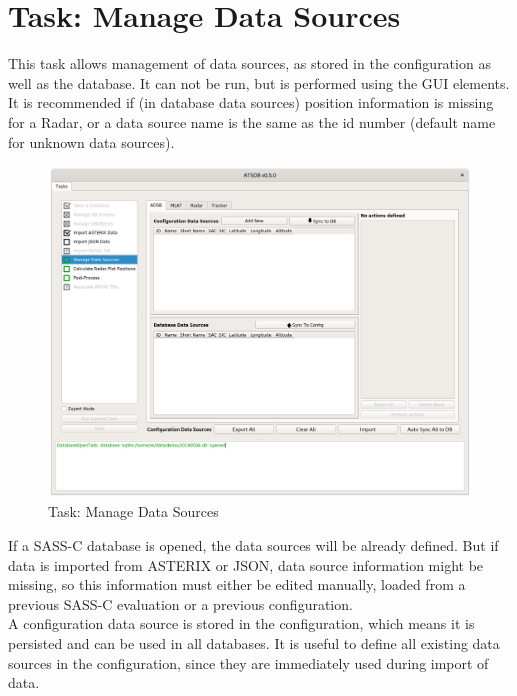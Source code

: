 \section{Task: Manage Data Sources}
\label{sec:task_manage_datasources}

This task allows management of data sources, as stored in the configuration as well as the database. It can not be run, but is performed using the GUI elements. \\

It is recommended if (in database data sources) position information is missing for a Radar, or a data source name is the same as the id number (default name for unknown data sources).

\begin{figure}[H]
  \hspace*{-2.5cm}
    \includegraphics[width=19cm]{../screenshots/manage_data_sources.png}
  \caption{Task: Manage Data Sources}
\end{figure}

If a SASS-C database is opened, the data sources will be already defined. But if data is imported from ASTERIX or JSON, data source information might be missing, so this information must either be edited manually, loaded from a previous SASS-C evaluation or a previous configuration. \\

A configuration data source is stored in the configuration, which means it is persisted and can be used in all databases. It is useful to define all existing data sources in the configuration, since they are immediately used during import of data. \\

